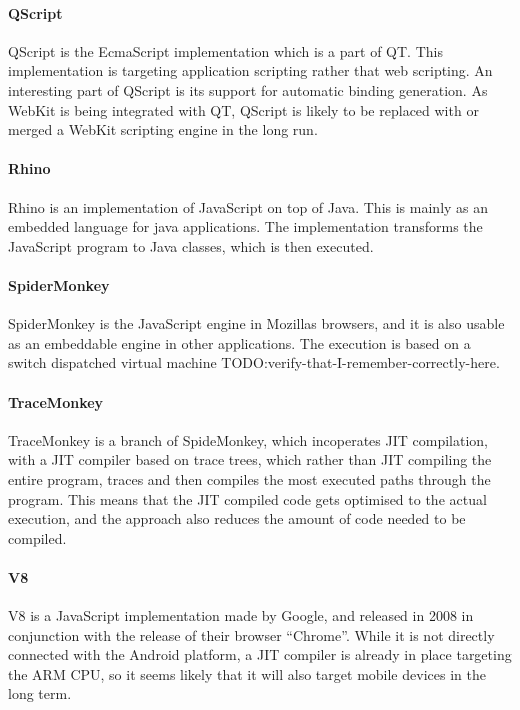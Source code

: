 \documentclass[11pt]{report}
\begin{document}
\paragraph{QScript}
QScript is the EcmaScript implementation which is a part of QT. This implementation is targeting application scripting rather that web scripting. An interesting part of QScript is its support for automatic binding generation. As WebKit is being integrated with QT, QScript is likely to be replaced with or merged a WebKit scripting engine in the long run.

\paragraph{Rhino}
Rhino is an implementation of JavaScript on top of Java. This is mainly as an embedded language for java applications. The implementation transforms the JavaScript program to Java classes, which is then executed.

\paragraph{SpiderMonkey}
\label{spidermonkey}
SpiderMonkey \cite{spidermonkey} is the JavaScript engine in Mozillas browsers, and it is also usable as an embeddable engine in other applications. The execution is based on a switch dispatched virtual machine TODO:verify-that-I-remember-correctly-here.

\paragraph{TraceMonkey} 
TraceMonkey is a branch of SpideMonkey, which incoperates JIT compilation, with a JIT compiler based on trace trees\cite{trace-tree}, 
which rather than JIT compiling the entire program,
traces and then compiles the most executed paths through the program.
This means that the JIT compiled code gets optimised to the actual execution,
and the approach also reduces the amount of code needed to be compiled.

\paragraph{V8} V8 \cite{v8} is a JavaScript implementation made by Google, and released in 2008 in conjunction with the release of their browser ``Chrome''. 
While it is not directly connected with the Android platform, a JIT compiler is already in place targeting the ARM CPU, so it seems likely that it will also target mobile devices in the long term.
\end{document}
